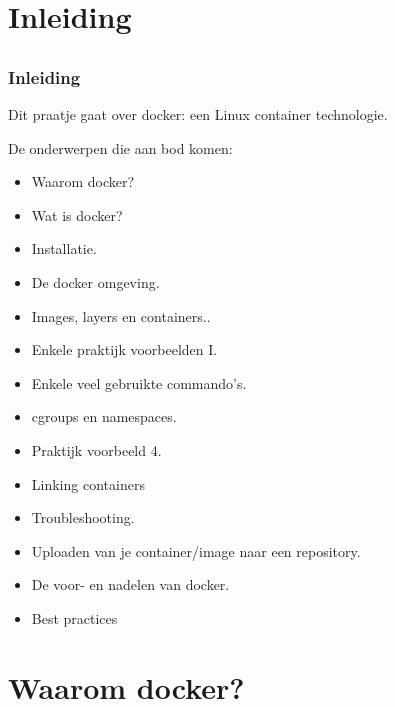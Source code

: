 \section{Inleiding}
\subsection{}
\begin{styleframe}
	\frametitle{Inleiding}
Dit praatje gaat over docker: een Linux container technologie.

De onderwerpen die aan bod komen:
\begin{itemize}
	\item Waarom docker?
	\item Wat is docker?
	\item Installatie.
	\item De docker omgeving.
	\item Images, layers en containers..
	\item Enkele praktijk voorbeelden I.
	\item Enkele veel gebruikte commando's.
	\item cgroups en namespaces.
	\item Praktijk voorbeeld 4.
	\item Linking containers
	\item Troubleshooting.
	\item Uploaden van je container/image naar een repository.
	\item De voor- en nadelen van docker.
	\item Best practices
\end{itemize}
\end{styleframe}

\section{Waarom docker?}
